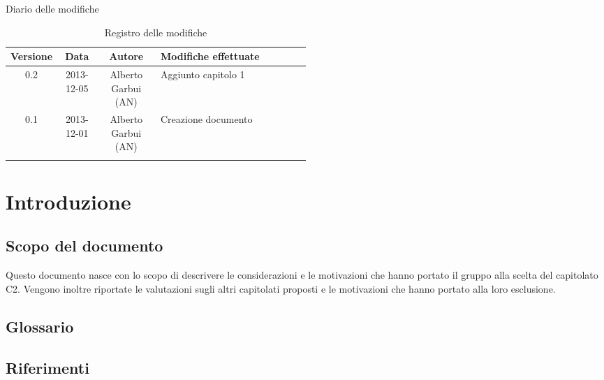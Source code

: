 
\newpage
Diario delle modifiche
\begin{center}
\begin{longtable}{|c|c|c|p{0.5\linewidth}|}
\toprule
\textbf{Versione} & \textbf{Data} & \textbf{Autore} & \textbf{Modifiche effettuate}\\


\midrule
0.2 & 2013-12-05 & Alberto Garbui (AN) & Aggiunto capitolo 1\\
\midrule
0.1 & 2013-12-01 & Alberto Garbui (AN) & Creazione documento\\

\bottomrule
\caption{Registro delle modifiche}
\label{tab:changelog}
\end{longtable}
\end{center}

\newpage
\tableofcontents

\newpage
\listoftables
\listoffigures

\newpage
\section{Introduzione}%
\label{1.0}
\subsection{Scopo del documento}%
\label{1.1}
Questo documento nasce con lo scopo di descrivere le considerazioni e le motivazioni che hanno portato il gruppo alla scelta del capitolato C2. Vengono inoltre riportate le valutazioni sugli altri capitolati proposti e le motivazioni che hanno portato alla loro esclusione.

\subsection{Glossario}%
\label{1.2}
\Glossario{}

\subsection{Riferimenti} %
\label{1.3}

